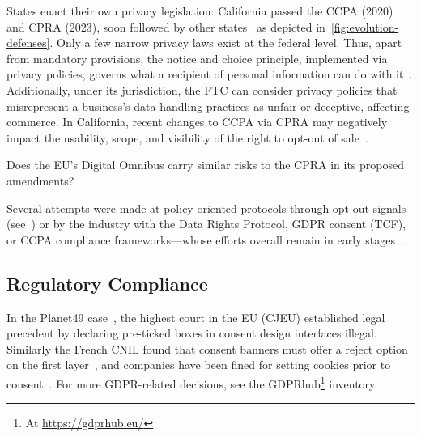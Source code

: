 \label{sec:us-regulations}
%
States enact their own privacy legislation: California passed the CCPA (2020) and CPRA (2023), soon followed by other states~\cite{birrellSoKTechnicalImplementation2024,vannortwickSettingBarLow2022} as depicted in~\autoref{fig:evolution-defenses}.
%
Only a few narrow privacy laws exist at the federal level.
Thus, apart from mandatory provisions, the notice and choice principle, implemented via privacy policies, governs what a recipient of personal information can do with it~\cite{zimmeckInformationPrivacyLaw2013,schaubDesignSpaceEffective2015}. 
% 
Additionally, under its jurisdiction, the FTC can consider privacy policies that misrepresent a business's data handling practices as unfair or deceptive, affecting commerce.
%
In California, recent changes to CCPA via CPRA may negatively impact the usability, scope, and visibility of the right to opt-out of sale~\cite{charatanTwoStepsForward2024}.

\begin{opbox}
Does the EU's Digital Omnibus carry similar risks to the CPRA in its proposed amendments?
\end{opbox}


\label{sec:policy-solutions}
Several attempts were made at policy-oriented protocols through opt-out signals (see~) or by the industry with the Data Rights Protocol, GDPR consent (TCF), or CCPA compliance frameworks---whose efforts overall remain in early stages~\cite{hilsMeasuringEmergenceConsent2020,matteCookieBannersRespect2020,azizJohnnyStillCant2024}.

\subsection{Regulatory Compliance}

In the Planet49 case~\cite{bouhoulaAutomatedLargeScaleAnalysis2024}, the highest court in the EU (CJEU) established legal precedent by declaring pre-ticked boxes in consent design interfaces illegal. Similarly the French
CNIL
found that consent banners must offer a reject option on the first layer~\cite{bielovaEffectDesignPatterns2024},
and companies have been fined for setting cookies prior to consent~\cite{sunGDPRxivEstablishingState2023,marjanovDataSecurityGround2023}.
For more GDPR-related decisions, see the GDPRhub\footnote{At \url{https://gdprhub.eu/}} inventory.

